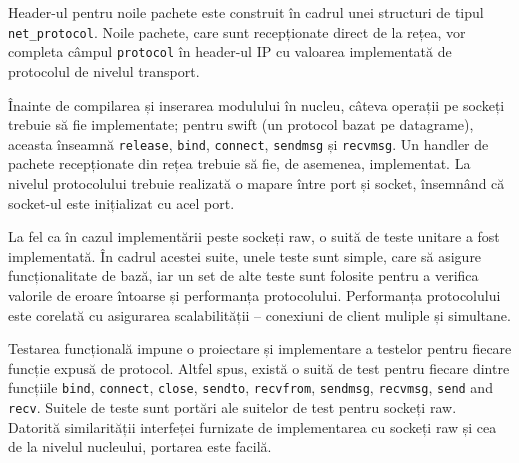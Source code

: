 Header-ul pentru noile pachete este construit în cadrul unei structuri de
tipul \texttt{net\_protocol}. Noile pachete, care sunt recepționate direct de
la rețea, vor completa câmpul \texttt{protocol} în header-ul IP cu valoarea
implementată de protocolul de nivelul transport.

Înainte de compilarea și inserarea modulului în nucleu, câteva operații pe
sockeți trebuie să fie implementate; pentru swift (un protocol bazat pe
datagrame), aceasta înseamnă \texttt{release}, \texttt{bind}, \texttt{connect},
\texttt{sendmsg} și \texttt{recvmsg}. Un handler de pachete recepționate din
rețea trebuie să fie, de asemenea, implementat. La nivelul protocolului
trebuie realizată o mapare între port și socket, însemnând că socket-ul este
inițializat cu acel port.

La fel ca în cazul implementării peste sockeți raw, o suită de teste unitare a
fost implementată. În cadrul acestei suite, unele teste sunt simple, care să
asigure funcționalitate de bază, iar un set de alte teste sunt folosite pentru a
verifica valorile de eroare întoarse și performanța protocolului. Performanța
protocolului este corelată cu asigurarea scalabilității -- conexiuni de
client muliple și simultane.

Testarea funcțională impune o proiectare și implementare a testelor pentru
fiecare funcție expusă de protocol. Altfel spus, există o suită de test pentru
fiecare dintre funcțiile \texttt{bind}, \texttt{connect}, \texttt{close},
\texttt{sendto}, \texttt{recvfrom}, \texttt{sendmsg}, \texttt{recvmsg},
\texttt{send} and \texttt{recv}. Suitele de teste sunt portări ale suitelor
de test pentru sockeți raw. Datorită similarității interfeței furnizate de
implementarea cu sockeți raw și cea de la nivelul nucleului, portarea este
facilă.
